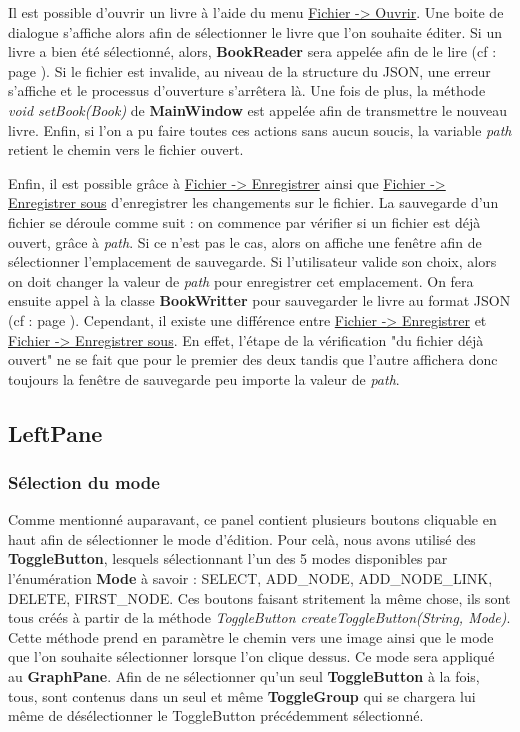 				Il est possible d'ouvrir un livre à l'aide du menu \underline{Fichier -> Ouvrir}. Une boite de dialogue s'affiche alors afin de sélectionner le livre que l'on souhaite éditer. Si un livre a bien été sélectionné, alors, \textbf{BookReader} sera appelée afin de le lire (cf :  page \pageref{subsec:lecture_ecriture_fichier}). Si le fichier est invalide, au niveau de la structure du JSON, une erreur s'affiche et le processus d'ouverture s'arrêtera là. Une fois de plus, la méthode \textit{void setBook(Book)} de \textbf{MainWindow} est appelée afin de transmettre le nouveau livre. Enfin, si l'on a pu faire toutes ces actions sans aucun soucis, la variable \textit{path} retient le chemin vers le fichier ouvert.

				Enfin, il est possible grâce à \underline{Fichier -> Enregistrer} ainsi que \underline{Fichier -> Enregistrer sous} d'enregistrer les changements sur le fichier. La sauvegarde d'un fichier se déroule comme suit : on commence par vérifier si un fichier est déjà ouvert, grâce à \textit{path}. Si ce n'est pas le cas, alors on affiche une fenêtre afin de sélectionner l'emplacement de sauvegarde. Si l'utilisateur valide son choix, alors on doit changer la valeur de \textit{path} pour enregistrer cet emplacement. On fera ensuite appel à la classe \textbf{BookWritter} pour sauvegarder le livre au format JSON (cf :  page \pageref{subsec:lecture_ecriture_fichier}). Cependant, il existe une différence entre \underline{Fichier -> Enregistrer} et \underline{Fichier -> Enregistrer sous}. En effet, l'étape de la vérification "du fichier déjà ouvert" ne se fait que pour le premier des deux tandis que l'autre affichera donc toujours la fenêtre de sauvegarde peu importe la valeur de \textit{path}.

		\subsection{LeftPane}

			\subsubsection{Sélection du mode}

				Comme mentionné auparavant, ce panel contient plusieurs boutons cliquable en haut afin de sélectionner le mode d'édition. Pour celà, nous avons utilisé des \textbf{ToggleButton}, lesquels sélectionnant l'un des 5 modes disponibles par l'énumération \textbf{Mode} à savoir : SELECT, ADD\_NODE, ADD\_NODE\_LINK, DELETE, FIRST\_NODE. Ces boutons faisant stritement la même chose, ils sont tous créés à partir de la méthode \textit{ToggleButton createToggleButton(String, Mode)}. Cette méthode prend en paramètre le chemin vers une image ainsi que le mode que l'on souhaite sélectionner lorsque l'on clique dessus. Ce mode sera appliqué au \textbf{GraphPane}. Afin de ne sélectionner qu'un seul \textbf{ToggleButton} à la fois, tous, sont contenus dans un seul et même \textbf{ToggleGroup} qui se chargera lui même de désélectionner le ToggleButton précédemment sélectionné.

